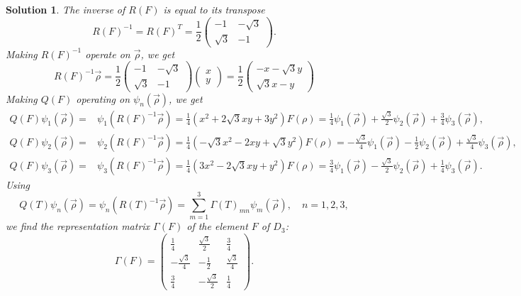 \documentclass[UTF8,10pt,a4paper]{article}
\theoremstyle{Problem}
\theoremstyle{Solution}
\newtheorem*{sol}{Solution}
\begin{document}
\begin{sol}
    The inverse of $R(F)$ is equal to its transpose
    \begin{equation}
        R(F)^{-1}=R(F)^T=\frac{1}{2}\left(\begin{matrix}
            -1&-\sqrt{3}\\
            \sqrt{3}&-1
        \end{matrix}\right).
    \end{equation}
    Making $R(F)^{-1}$ operate on $\vec{\rho}$, we get
    \begin{equation}
        R(F)^{-1}\vec{\rho}=\frac{1}{2}\left(\begin{matrix}
            -1&-\sqrt{3}\\
            \sqrt{3}&-1
        \end{matrix}\right)\left(\begin{matrix}
            x\\
            y
        \end{matrix}\right)=\frac{1}{2}\left(\begin{matrix}
            -x-\sqrt{3}y\\
            \sqrt{3}x-y
        \end{matrix}\right)
    \end{equation}
    Making $Q(F)$ operating on $\psi_n(\vec{\rho})$, we get
    \begin{align}
        Q(F)\psi_1(\vec{\rho})=&\psi_1(R(F)^{-1}\vec{\rho})=\frac{1}{4}(x^2+2\sqrt{3}xy+3y^2)F(\rho)=\frac{1}{4}\psi_1(\vec{\rho})+\frac{\sqrt{3}}{2}\psi_2(\vec{\rho})+\frac{3}{4}\psi_3(\vec{\rho}),\\
        Q(F)\psi_2(\vec{\rho})=&\psi_2(R(F)^{-1}\vec{\rho})=\frac{1}{4}(-\sqrt{3}x^2-2xy+\sqrt{3}y^2)F(\rho)=-\frac{\sqrt{3}}{4}\psi_1(\vec{\rho})-\frac{1}{2}\psi_2(\vec{\rho})+\frac{\sqrt{3}}{4}\psi_3(\vec{\rho}),\\
        Q(F)\psi_3(\vec{\rho})=&\psi_3(R(F)^{-1}\vec{\rho})=\frac{1}{4}(3x^2-2\sqrt{3}xy+y^2)F(\rho)=\frac{3}{4}\psi_1(\vec{\rho})-\frac{\sqrt{3}}{2}\psi_2(\vec{\rho})+\frac{1}{4}\psi_3(\vec{\rho}).
    \end{align}
    Using
    \begin{equation}
        Q(T)\psi_n(\vec{\rho})=\psi_n(R(T)^{-1}\vec{\rho})=\sum_{m=1}^3\Gamma(T)_{mn}\psi_m(\vec{\rho}),\quad n=1,2,3,
    \end{equation}
    we find the representation matrix $\Gamma(F)$ of the element $F$ of $D_3$:
    \begin{equation}
        \Gamma(F)=\left(\begin{matrix}
            \frac{1}{4}&\frac{\sqrt{3}}{2}&\frac{3}{4}\\
            -\frac{\sqrt{3}}{4}&-\frac{1}{2}&\frac{\sqrt{3}}{4}\\
            \frac{3}{4}&-\frac{\sqrt{3}}{2}&\frac{1}{4}
        \end{matrix}\right).
    \end{equation}
\end{sol}
\end{document}
